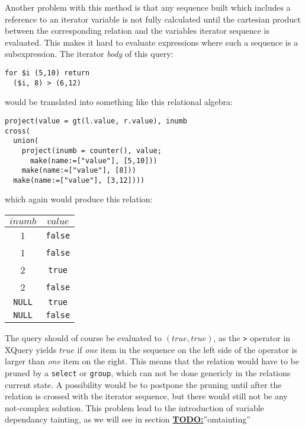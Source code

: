 Another problem with this method is that any sequence built which includes a reference to an iterator variable is
not fully calculated until the cartesian product between the corresponding relation and the variables iterator
sequence is evaluated. This makes it hard to evaluate expressions where such a sequence is a subexpression. The
iterator \textit{body} of this query:

\begin{Verbatim}
for $i (5,10) return
  ($i, 8) > (6,12)
\end{Verbatim}
would be translated into something like this relational algebra:
\begin{Verbatim}
project(value = gt(l.value, r.value), inumb
cross(
  union(
    project(inumb = counter(), value;
      make(name:=["value"], [5,10]))
    make(name:=["value"], [8]))
  make(name:=["value"], [3,12])))
\end{Verbatim}
which again would produce this relation:

\begin{figure*}[!h]
\centering
\begin{tabular}{|c|c|} \hline
$inumb$ & $value$ \\\hline
1 & \texttt{false} \\\hline
1 & \texttt{false} \\\hline
2 & \texttt{true} \\\hline
2 & \texttt{false} \\\hline
\texttt{NULL} & \texttt{true} \\\hline
\texttt{NULL} & \texttt{false} \\\hline
\end{tabular}
\end{figure*}

The query should of course be evaluated to $(true, true)$, as the \texttt{>} operator in XQuery yields $true$ if
\textit{one} item in the sequence on the left side of the operator is larger than \textit{one} item on the right.
This means that the relation would have to be pruned by a \texttt{select} or \texttt{group}, which can not be done
genericly in the relations current state. A possibility would be to postpone the pruning until after the relation
is crossed with the iterator sequence, but there would still not be any not-complex solution. This problem lead to
the introduction of variable dependancy tainting, as we will see in section \underline{\textbf{\LARGE
TODO:}}''omtainting''

